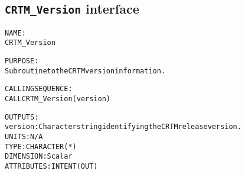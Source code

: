 \subsection{\texttt{CRTM\_Version} interface}
  \label{sec:CRTM_Version_interface}
  \begin{alltt}
 
  NAME:
        CRTM_Version
 
  PURPOSE:
        Subroutine to the CRTM version information.
 
  CALLING SEQUENCE:
        CALL CRTM_Version( version )
 
  OUTPUTS:
        version:       Character string identifying the CRTM release version.
                       UNITS:      N/A
                       TYPE:       CHARACTER(*)
                       DIMENSION:  Scalar
                       ATTRIBUTES: INTENT(OUT)
 
  \end{alltt}
